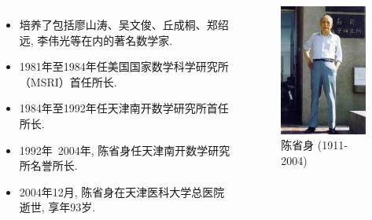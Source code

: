 \documentclass[10pt,punct]{ctexbeamer}
\begin{document}
%
%
%
%
%
%



\begin{frame}

	\begin{columns}[c]  %

		\column{6cm}
     \begin{itemize}
         \item 培养了包括廖山涛、吴文俊、丘成桐、郑绍远, 李伟光等在内的著名数学家.
         \item
         1981年至1984年任美国国家数学科学研究所（MSRI）首任所长.

         \item 1984年至1992年任天津南开数学研究所首任所长.
         \item 1992年~2004年, 陈省身任天津南开数学研究所名誉所长.

        \item  2004年12月, 陈省身在天津医科大学总医院逝世, 享年93岁.
     \end{itemize}


		\column{6.5cm}
		\begin{figure}[p]
			\includegraphics[scale=0.6]{chern.jpeg}
					\caption{陈省身 (1911-2004)}
    \end{figure}
	\end{columns}


\end{frame}
\end{document}
